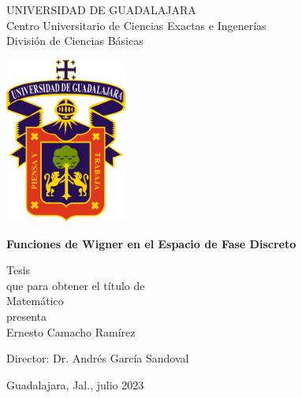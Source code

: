 \documentclass[a4paper,11pt]{report}
\begin{document}
  \begin{titlepage}
    \begin{center}
      \vspace{1.0in}

      \huge
      UNIVERSIDAD DE GUADALAJARA\\
      \vspace{0.2cm}
      \Large{Centro Universitario de Ciencias Exactas e
        Ingenerías} \\
      \vspace{0.2cm}
      División de Ciencias Básicas\\

      \vspace{0.5in}

      \includegraphics[width=0.3\textwidth]{imgs/udg}
      
      \vspace{0.5in}

      \huge
      \textbf{
        Funciones de Wigner en el Espacio de Fase Discreto
      }

      \large
      \vspace{1.0in}
      
      Tesis \\
      que para obtener el título de \\
      \vspace{0.2cm}
      \Large{Matemático} \\
      \vspace{0.2cm}
      presenta \\
      \vspace{0.2cm}
      \Large{Ernesto Camacho Ramírez} \\
      
      \vfill

      \large{Director: Dr. Andrés García Sandoval} \\

      \vspace{0.5cm}

      \large{Guadalajara, Jal., julio 2023}
     \end{center}
  \end{titlepage}
\end{document}

